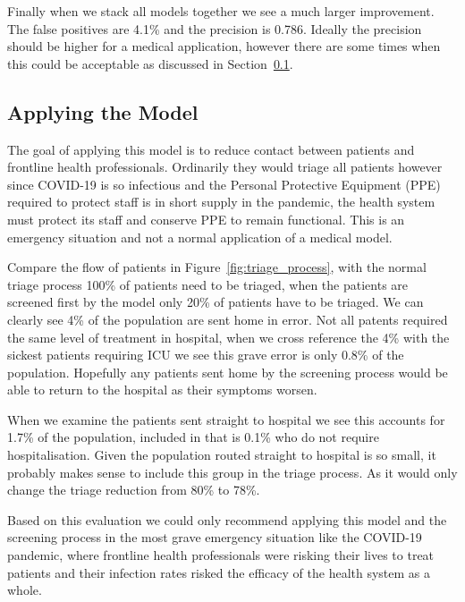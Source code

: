 Finally when we stack all models together we see a much larger improvement. The
false positives are 4.1\% and the precision is 0.786. Ideally the precision should
be higher for a medical application, however there are some times when this could be
acceptable as discussed in Section~\ref{apply_model}.

\subsection{Applying the Model}
\label{apply_model}

The goal of applying this model is to reduce contact between patients and frontline
health professionals. Ordinarily they would triage all patients however since COVID-19
is so infectious and the Personal Protective Equipment (PPE) required to protect staff
is in short supply in the pandemic, the health system must protect its staff and conserve
PPE to remain functional. This is an emergency situation and not a normal application of
a medical model.

Compare the flow of patients in Figure~\ref{fig:triage_process}, with the normal triage process
100\% of patients need to be triaged, when the patients are screened first by the model
only 20\% of patients have to be triaged. We can clearly see 4\% of the population are sent home
in error. Not all patents required the same level of treatment in hospital, when we cross
reference the 4\% with the sickest patients requiring ICU we see this grave error is only
0.8\% of the population. Hopefully any patients sent home by the screening process would be 
able to return to the hospital as their symptoms worsen.

When we examine the patients sent straight to hospital we see this accounts for 1.7\% of 
the population, included in that is 0.1\% who do not require hospitalisation. Given the
population routed straight to hospital is so small, it probably makes sense to include 
this group in the triage process. As it would only change the triage reduction from 80\% to
78\%.

Based on this evaluation we could only recommend applying this model and the screening process
in the most grave emergency situation like the COVID-19 pandemic, where frontline health
professionals were risking their lives to treat patients and their infection rates risked
the efficacy of the health system as a whole.

